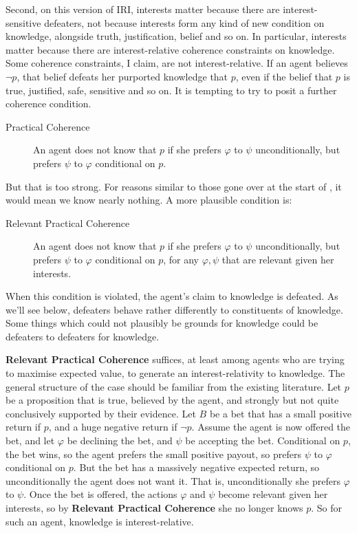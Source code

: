 Second, on this version of IRI, interests matter because there are interest-sensitive defeaters, not because interests form any kind of new condition on knowledge, alongside truth, justification, belief and so on. In particular, interests matter because there are interest-relative coherence constraints on knowledge. Some coherence constraints, I claim, are not interest-relative. If an agent believes $\neg p$, that belief defeats her purported knowledge that $p$, even if the belief that $p$ is true, justified, safe, sensitive and so on. It is tempting to try to posit a further coherence condition.

\begin{description}
\item[Practical Coherence] An agent does not know that $p$ if she prefers $\varphi$ to $\psi$ unconditionally, but prefers $\psi$ to $\varphi$ conditional on $p$.
\end{description}

\noindent But that is too strong. For reasons similar to those gone over at the start of \citet{Hawthorne2004}, it would mean we know nearly nothing. A more plausible condition is:

\begin{description}
\item[Relevant Practical Coherence] An agent does not know that $p$ if she prefers $\varphi$ to $\psi$ unconditionally, but prefers $\psi$ to $\varphi$ conditional on $p$, for any $\varphi, \psi$ that are relevant given her interests.
\end{description}

\noindent When this condition is violated, the agent's claim to knowledge is defeated. As we'll see below, defeaters behave rather differently to constituents of knowledge. Some things which could not plausibly be grounds for knowledge could be defeaters to defeaters for knowledge.

\textbf{Relevant Practical Coherence} suffices, at least among agents who are trying to maximise expected value, to generate an interest-relativity to knowledge. The general structure of the case should be familiar from the existing literature. Let $p$ be a proposition that is true, believed by the agent, and strongly but not quite conclusively supported by their evidence. Let $B$ be a bet that has a small positive return if $p$, and a huge negative return if $\neg p$. Assume the agent is now offered the bet, and let $\varphi$ be declining the bet, and $\psi$ be accepting the bet. Conditional on $p$, the bet wins, so the agent prefers the small positive payout, so prefers $\psi$ to $\varphi$ conditional on $p$. But the bet has a massively negative expected return, so unconditionally the agent does not want it. That is, unconditionally she prefers $\varphi$ to $\psi$. Once the bet is offered, the actions $\varphi$ and $\psi$ become relevant given her interests, so by \textbf{Relevant Practical Coherence} she no longer knows $p$. So for such an agent, knowledge is interest-relative.

